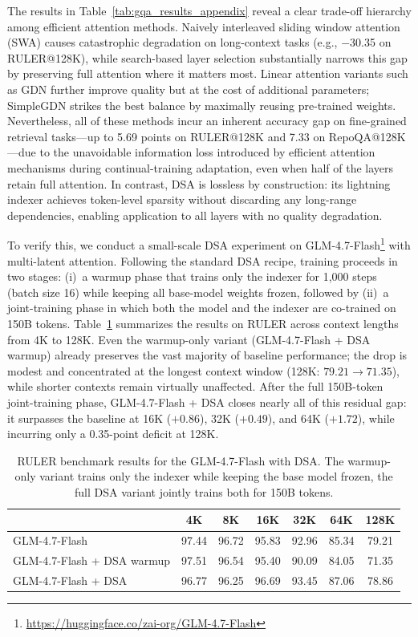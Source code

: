 The results in Table~\ref{tab:gqa_results_appendix} reveal a clear trade-off hierarchy among efficient attention methods. Naively interleaved sliding window attention (SWA) causes catastrophic degradation on long-context tasks (e.g., $-$30.35 on RULER@128K), while search-based layer selection substantially narrows this gap by preserving full attention where it matters most. Linear attention variants such as GDN further improve quality but at the cost of additional parameters; SimpleGDN strikes the best balance by maximally reusing pre-trained weights. Nevertheless, all of these methods incur an inherent accuracy gap on fine-grained retrieval tasks—up to 5.69 points on RULER@128K and 7.33 on RepoQA@128K—due to the unavoidable information loss introduced by efficient attention mechanisms during continual-training adaptation, even when half of the layers retain full attention. In contrast, DSA is lossless by construction: its lightning indexer achieves token-level sparsity without discarding any long-range dependencies, enabling application to all layers with no quality degradation.


To verify this, we conduct a small-scale DSA experiment on GLM-4.7-Flash\footnote{\url{https://huggingface.co/zai-org/GLM-4.7-Flash}} with multi-latent attention. Following the standard DSA recipe, training proceeds in two stages: (i)~a {warmup} phase that trains only the indexer for 1{,}000 steps (batch size 16) while keeping all base-model weights frozen, followed by (ii)~a {joint-training} phase in which both the model and the indexer are co-trained on 150B tokens.
Table~\ref{tab:dsa_ruler_results} summarizes the results on RULER across context lengths from 4K to 128K. Even the warmup-only variant ({GLM-4.7-Flash + DSA warmup}) already preserves the vast majority of baseline performance; the drop is modest and concentrated at the longest context window (128K: $79.21 \to 71.35$), while shorter contexts remain virtually unaffected. After the full 150B-token joint-training phase, {GLM-4.7-Flash + DSA} closes nearly all of this residual gap: it {surpasses} the baseline at 16K ($+0.86$), 32K ($+0.49$), and 64K ($+1.72$), while incurring only a 0.35-point deficit at 128K.

\begin{table}[t]
    \small
    \centering
    \caption{RULER benchmark results for the GLM-4.7-Flash with DSA.
    The warmup-only variant trains only the indexer while
    keeping the base model frozen, the full DSA variant jointly trains both for
    150B tokens. }
   \label{tab:dsa_ruler_results}
    \begin{tabular}{lcccccc}
        \toprule
         & {4K} & {8K} & {16K} & {32K} & {64K} & {128K} \\
        \midrule
        GLM-4.7-Flash  & 97.44 & 96.72 & 95.83 & 92.96 & 85.34 & 79.21 \\
        GLM-4.7-Flash + DSA warmup & 97.51 & 96.54 & 95.40 & 90.09 & 84.05 & 71.35  \\
        GLM-4.7-Flash + DSA & 96.77 & 96.25 & 96.69 & 93.45 & 87.06 & 78.86 \\
        \bottomrule
    \end{tabular}
\end{table}



